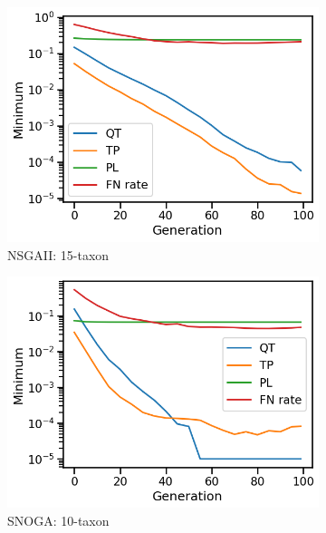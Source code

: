 \begin{figure}[!htbp]
\begin{adjustwidth}{-1cm}{-1cm}
\begin{subfigure}[b]{0.4\textwidth}
			\includegraphics[width=\textwidth]{Figure/15-taxon_NSGAII_minimum}
			\caption{NSGAII: 15-taxon}
		\end{subfigure}
		\begin{subfigure}[b]{0.4\textwidth}
			\includegraphics[width=\textwidth]{Figure/10-taxon_NOSSGA_minimum}
			\caption{SNOGA: 10-taxon}
		\end{subfigure}%
		\begin{subfigure}[b]{0.4\textwidth}

\end{subfigure}
\end{adjustwidth}
\end{figure}
